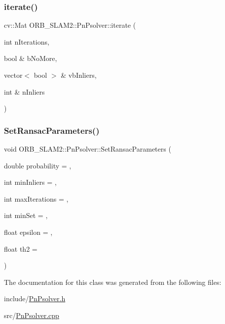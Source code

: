 \mbox{\label{class_o_r_b___s_l_a_m2_1_1_pn_psolver_abbef2ac776747661112246e85667f452}} 
\subsubsection{\texorpdfstring{iterate()}{iterate()}}
{\footnotesize\ttfamily cv\+::\+Mat O\+R\+B\+\_\+\+S\+L\+A\+M2\+::\+Pn\+Psolver\+::iterate (\begin{DoxyParamCaption}\item[{int}]{n\+Iterations,  }\item[{bool \&}]{b\+No\+More,  }\item[{vector$<$ bool $>$ \&}]{vb\+Inliers,  }\item[{int \&}]{n\+Inliers }\end{DoxyParamCaption})}

\mbox{\label{class_o_r_b___s_l_a_m2_1_1_pn_psolver_adff29377dcc77891a33113080b6b1eb7}} 
\subsubsection{\texorpdfstring{Set\+Ransac\+Parameters()}{SetRansacParameters()}}
{\footnotesize\ttfamily void O\+R\+B\+\_\+\+S\+L\+A\+M2\+::\+Pn\+Psolver\+::\+Set\+Ransac\+Parameters (\begin{DoxyParamCaption}\item[{double}]{probability = {},  }\item[{int}]{min\+Inliers = {},  }\item[{int}]{max\+Iterations = {},  }\item[{int}]{min\+Set = {},  }\item[{float}]{epsilon = {},  }\item[{float}]{th2 = {} }\end{DoxyParamCaption})}



The documentation for this class was generated from the following files\+:\begin{DoxyCompactItemize}
\item 
include/\mbox{\hyperlink{_pn_psolver_8h}{Pn\+Psolver.\+h}}\item 
src/\mbox{\hyperlink{_pn_psolver_8cpp}{Pn\+Psolver.\+cpp}}\end{DoxyCompactItemize}
